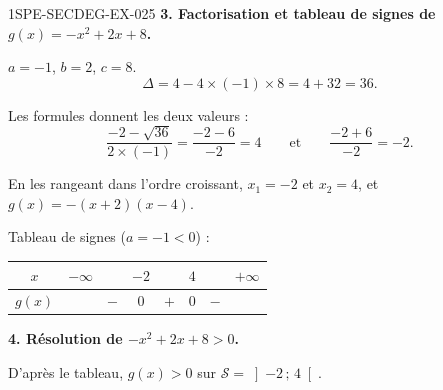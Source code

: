 \begin{corrige}{1SPE-SECDEG-EX-025}
\medskip
\textbf{3. Factorisation et tableau de signes de $g(x) = -x^2 + 2x + 8$.}


$a = -1$, $b = 2$, $c = 8$.
\[\Delta = 4 - 4 \times (-1) \times 8 = 4 + 32 = 36.\]

Les formules donnent les deux valeurs :
\[\frac{-2 - \sqrt{36}}{2 \times (-1)} = \frac{-2 - 6}{-2} = 4 \qquad \text{et} \qquad \frac{-2 + 6}{-2} = -2.\]

En les rangeant dans l'ordre croissant, $x_1 = -2$ et $x_2 = 4$,
et $g(x) = -(x + 2)(x - 4)$.

Tableau de signes ($a = -1 < 0$) :

\medskip
\begin{center}
\begin{tabular}{|c|ccccccc|}
\hline
$x$ & $-\infty$ & & $-2$ & & $4$ & & $+\infty$ \\
\hline
$g(x)$ & & $-$ & $0$ & $+$ & $0$ & $-$ & \\
\hline
\end{tabular}
\end{center}

\medskip
\textbf{4. Résolution de $-x^2 + 2x + 8 > 0$.}


D'après le tableau, $g(x) > 0$ sur $\mathcal{S} = \left]-2\,;\,4\right[$.

\end{corrige}
